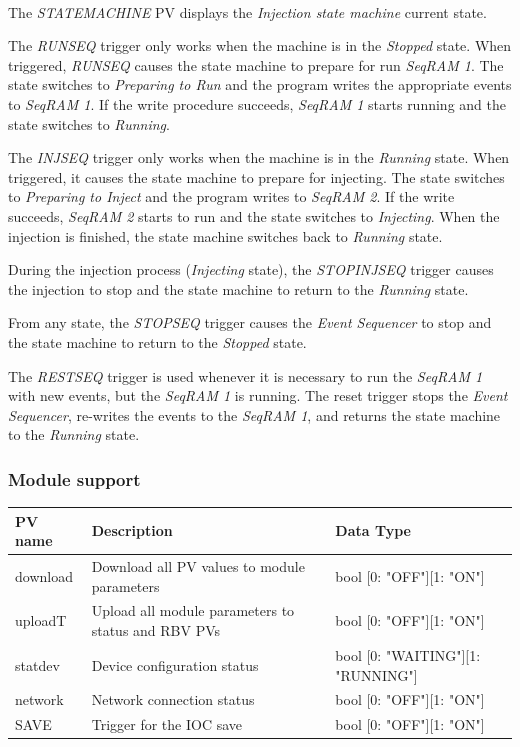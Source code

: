 \documentclass[openany]{article}
\begin{document}
			\paragraph{} The \emph{STATEMACHINE} PV displays the \emph{Injection state machine} current state.
			\par The \emph{RUNSEQ} trigger only works when the machine is in the \emph{Stopped} state. When triggered, \emph{RUNSEQ} causes the state machine to prepare for run \emph{SeqRAM 1}. The state switches to \emph{Preparing to Run} and the program writes the appropriate events to \emph{SeqRAM 1}. If the write procedure succeeds, \emph{SeqRAM 1} starts running and the state switches to \emph{Running}.
			\par The \emph{INJSEQ} trigger only works when the machine is in the \emph{Running} state. When triggered, it causes the state machine to prepare for injecting. The state switches to \emph{Preparing to Inject} and the program writes to \emph{SeqRAM 2}. If the write succeeds, \emph{SeqRAM 2} starts to run and the state switches to \emph{Injecting}. When the injection is finished, the state machine switches back to \emph{Running} state.
			\par During the injection process (\emph{Injecting} state), the \emph{STOPINJSEQ} trigger causes the injection to stop and the state machine to return to the \emph{Running} state.
			\par From any state, the \emph{STOPSEQ} trigger causes the \emph{Event Sequencer} to stop and the state machine to return to the \emph{Stopped} state.
			\par The \emph{RESTSEQ} trigger is used whenever it is necessary to run the \emph{SeqRAM 1} with new events, but the \emph{SeqRAM 1} is running. The reset trigger stops the \emph{Event Sequencer}, re-writes the events to the \emph{SeqRAM 1}, and returns the state machine to the \emph{Running} state.

		\subsubsection{Module support}\label{pvgroup:evg-module-support}
			\begin{center}
			\begin{tabular}{| m{2.8cm} m{6cm} m{6cm} |}
			    \hline
			    \bfseries PV name & \bfseries Description & \bfseries Data Type \\ \hline
			    download & Download all PV values to module parameters & bool [0: "OFF"][1: "ON"] \\ \hline
			    uploadT & Upload all module parameters to status and RBV PVs & bool [0: "OFF"][1: "ON"] \\ \hline
			    statdev & Device configuration status & bool [0: "WAITING"][1: "RUNNING"] \\ \hline
			    network & Network connection status & bool [0: "OFF"][1: "ON"] \\ \hline
			    SAVE & Trigger for the IOC save & bool [0: "OFF"][1: "ON"] \\ \hline
			\end{tabular}
			\end{center}
\end{document}
